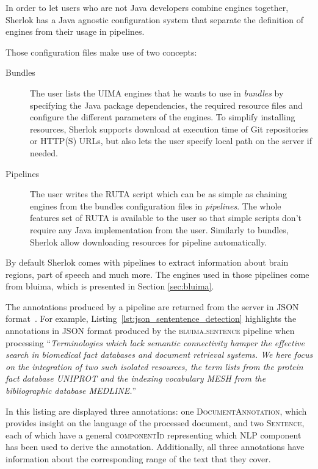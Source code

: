 \documentclass{article}
\newcommand{\ID}[1]{{\textsc{#1}}}
\begin{document}
In order to let users who are not Java developers combine engines together, Sherlok has a Java
agnostic configuration system that separate the definition of engines from their usage in pipelines.

Those configuration files make use of two concepts:

\begin{description}
    \item[Bundles] The user lists the UIMA engines that he wants to use in \emph{bundles} by
        specifying the Java package dependencies, the required resource files and configure the
        different parameters of the engines. To simplify installing resources, Sherlok supports
        download at execution time of Git repositories or HTTP(S) URLs, but also lets the user
        specify local path on the server if needed.
    \item[Pipelines] The user writes the RUTA script which can be as simple as chaining engines from
        the bundles configuration files in \emph{pipelines}. The whole features set of RUTA is
        available to the user so that simple scripts don't require any Java implementation from the
        user. Similarly to bundles, Sherlok allow downloading resources for pipeline automatically.
\end{description}

By default Sherlok comes with pipelines to extract information about brain regions, part of speech
and much more. The engines used in those pipelines come from bluima, which is presented in Section
\ref{sec:bluima}.

The annotations produced by a pipeline are returned from the server in JSON format~\cite{json}. For
example, Listing~\ref{lst:json_sententence_detection} highlights the annotations in JSON format
produced by the \ID{bluima.sentence} pipeline when processing ``\textit{Terminologies which lack
semantic connectivity hamper the effective search in biomedical fact databases and document
retrieval systems. We here focus on the integration of two such isolated resources, the term lists
from the protein fact database UNIPROT and the indexing vocabulary MESH from the bibliographic
database MEDLINE.}''

In this listing are displayed three annotations: one \ID{DocumentAnnotation}, which provides insight
on the language of the processed document, and two \ID{Sentence}, each of which have a general
\ID{componentId} representing which NLP component has been used to derive the annotation.
Additionally, all three annotations have information about the corresponding range of the text that
they cover.
\end{document}

